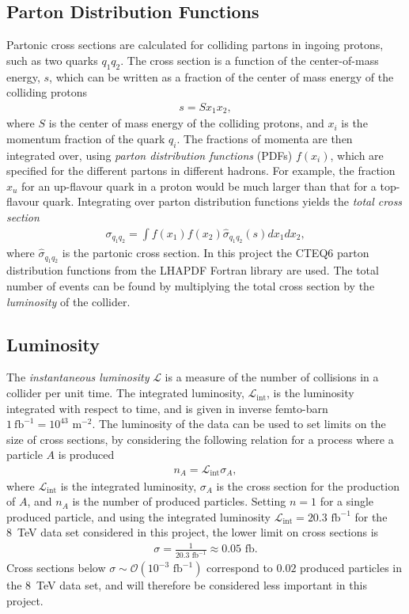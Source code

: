 \documentclass[twoside,english]{uiofysmaster}
\begin{document}
{\subsection{Parton Distribution Functions}

Partonic cross sections are calculated for colliding partons in ingoing protons, such as two quarks $q_1 q_2$. The cross section is a function of the center-of-mass energy, $s$, which can be written as a fraction of the center of mass energy of the colliding protons
\begin{align}
s = S x_1 x_2,
\end{align}
where $S$ is the center of mass energy of the colliding protons, and $x_i$ is the momentum fraction of the quark $q_i$. The fractions of momenta are then integrated over, using \textit{parton distribution functions} (PDFs) $f(x_i)$, which are specified for the different partons in different hadrons. For example, the fraction $x_u$ for an up-flavour quark in a proton would be much larger than that for a top-flavour quark. Integrating over parton distribution functions yields the \textit{total cross section}
\begin{align}
\sigma_{q_1q_2} = \int f(x_1) f(x_2) \hat{\sigma}_{q_1q_2}(s) dx_1 dx_2,
\end{align}
where $\hat{\sigma}_{q_1q_2}$ is the partonic cross section. In this project the CTEQ6 parton distribution functions from the LHAPDF Fortran library \cite{PhysRevD.78.013004} are used. The total number of events can be found by multiplying the total cross section by the \textit{luminosity} of the collider.

\subsection{Luminosity}

The \textit{instantaneous luminosity} $\mathcal{L}$ is a measure of the number of collisions in a collider per unit time. The integrated luminosity, $\mathcal{L}_{\mathrm{int}}$, is the luminosity integrated with respect to time, and is given in inverse femto-barn $1~\mathrm{fb}^{-1} = 10^{43} \text{ m}^{-2}$. The luminosity of the data can be used to set limits on the size of cross sections, by considering the following relation for a process where a particle $A$ is produced
\begin{align}
n_{A} = \mathcal{L}_{\mathrm{int}} \sigma_{A} ,
\end{align}
where $\mathcal{L}_{\mathrm{int}}$ is the integrated luminosity, $\sigma_{A}$ is the cross section for the production of $A$, and $n_A$ is the number of produced particles. Setting $n=1$ for a single produced particle, and using the integrated luminosity $\mathcal{L}_{\mathrm{int}} = 20.3 \text{ fb}^{-1}$ for the 8~TeV data set considered in this project, the lower limit on cross sections is
\begin{align}
\sigma  = \frac{1}{20.3 \text{ fb}^{-1}} \approx 0.05 \text{ fb}.
\end{align}
Cross sections below $\sigma \sim \mathcal{O}(10^{-3} \text{ fb}^{-1})$ correspond to $0.02$ produced particles in the 8~TeV data set, and will therefore be considered less important in this project.


}
\end{document}
